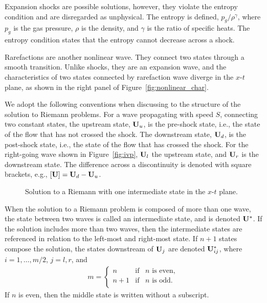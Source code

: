 Expansion shocks are possible solutions, however, they violate the entropy condition and are disregarded as unphysical.  The entropy is defined, $p_g/\rho^{\gamma}$, where $p_g$ is the gas pressure, $\rho$ is the density, and $\gamma$ is the ratio of specific heats.  The entropy condition states that the entropy cannot decrease across a shock.    

Rarefactions are another nonlinear wave.  They connect two states through a smooth transition.  Unlike shocks, they are an expansion wave, and the characteristics of two states connected by rarefaction wave diverge in the $x$-$t$ plane, as shown in the right panel of Figure~\ref{fig:nonlinear_char}.

We adopt the following conventions when discussing to the structure of the solution to Riemann problems.  For a wave propagating with speed $S$, connecting two constant states, the upstream state, $\mathbf{U}_u$, is the pre-shock state, i.e., the state of the flow that has not crossed the shock.  The downstream state, $\mathbf{U}_d$, is the post-shock state, i.e., the state of the flow that has crossed the shock.  For the right-going wave shown in Figure~\ref{fig:ivp}, $\mathbf{U}_l$ the upstream state, and $\mathbf{U}_r$ is the downstream state.  The difference across a discontinuity is denoted with square brackets, e.g., $[ \mathbf{U} ] = \mathbf{U}_d - \mathbf{U}_u$.

\begin{figure}[htbp]\figSpace
\begin{center}

\end{center}
\caption{Solution to a Riemann with one intermediate state in the $x$-$t$ plane.}
\label{fig:inter_rstates}
\figSpace
\end{figure}

When the solution to a Riemann problem is composed of more than one wave, the state between two waves is called an intermediate state, and is denoted $\mathbf{U}^*$.  If the solution includes more than two waves, then the intermediate states are referenced in relation to the left-most and right-most state.  If $n+1$ states compose the solution, the states downstream of $\mathbf{U}_{j}$ are denoted $\mathbf{U}_{ij}^*$, where $i=1,\hdots,m/2$, $j = l,r$, and
\begin{gather*}
m = 
\begin{cases}
n & \text{if}\;\;\; n \text{ is even}, \\
n+1 & \text{if}\;\;\; n \text{ is odd}. \\
\end{cases}
\end{gather*} 
If $n$ is even, then the middle state is written without a subscript.

